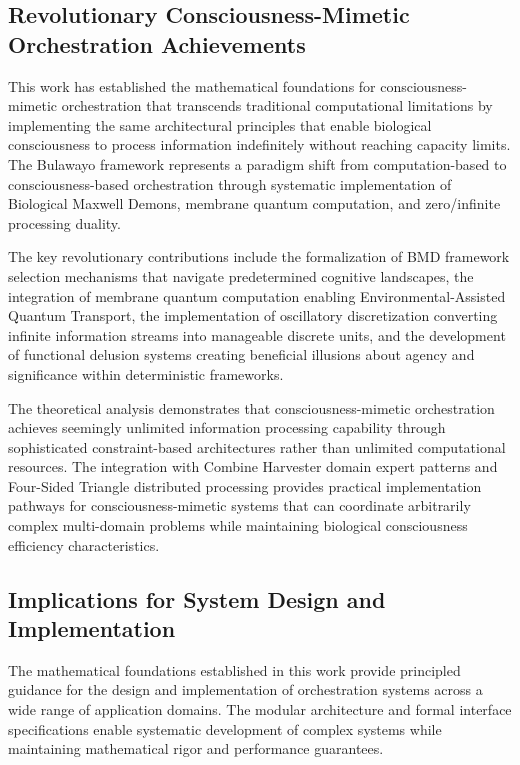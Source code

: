 \documentclass[12pt,a4paper]{article}
\begin{document}
{{{\subsection{Revolutionary Consciousness-Mimetic Orchestration Achievements}

This work has established the mathematical foundations for consciousness-mimetic orchestration that transcends traditional computational limitations by implementing the same architectural principles that enable biological consciousness to process information indefinitely without reaching capacity limits. The Bulawayo framework represents a paradigm shift from computation-based to consciousness-based orchestration through systematic implementation of Biological Maxwell Demons, membrane quantum computation, and zero/infinite processing duality.

The key revolutionary contributions include the formalization of BMD framework selection mechanisms that navigate predetermined cognitive landscapes, the integration of membrane quantum computation enabling Environmental-Assisted Quantum Transport, the implementation of oscillatory discretization converting infinite information streams into manageable discrete units, and the development of functional delusion systems creating beneficial illusions about agency and significance within deterministic frameworks.

The theoretical analysis demonstrates that consciousness-mimetic orchestration achieves seemingly unlimited information processing capability through sophisticated constraint-based architectures rather than unlimited computational resources. The integration with Combine Harvester domain expert patterns and Four-Sided Triangle distributed processing provides practical implementation pathways for consciousness-mimetic systems that can coordinate arbitrarily complex multi-domain problems while maintaining biological consciousness efficiency characteristics.

\subsection{Implications for System Design and Implementation}

The mathematical foundations established in this work provide principled guidance for the design and implementation of orchestration systems across a wide range of application domains. The modular architecture and formal interface specifications enable systematic development of complex systems while maintaining mathematical rigor and performance guarantees.

}}}
\end{document}
